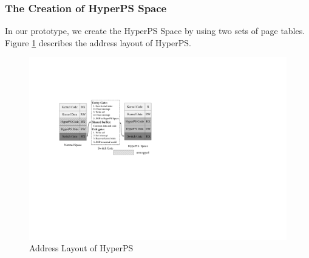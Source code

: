 \subsubsection{The Creation of HyperPS Space}%
\label{ssub:hyperps_space_creation}

In our prototype, we create the HyperPS Space by using two sets of page tables.  
Figure \ref{fig:address} describes the address layout of HyperPS. 
\begin{figure}[htpb]
    \centering
    \includegraphics[width=0.8\linewidth]{IMG/address.pdf}
    \caption{Address Layout of HyperPS}%
    \label{fig:address}
\end{figure}


